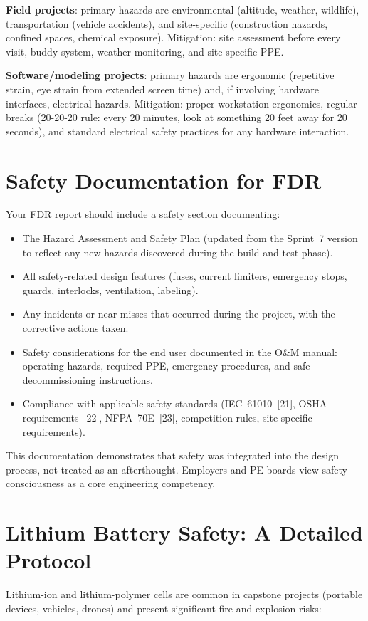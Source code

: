 \textbf{Field projects}: primary hazards are environmental (altitude, weather, wildlife), transportation (vehicle accidents), and site-specific (construction hazards, confined spaces, chemical exposure). Mitigation: site assessment before every visit, buddy system, weather monitoring, and site-specific PPE.

\textbf{Software/modeling projects}: primary hazards are ergonomic (repetitive strain, eye strain from extended screen time) and, if involving hardware interfaces, electrical hazards. Mitigation: proper workstation ergonomics, regular breaks (20-20-20 rule: every 20 minutes, look at something 20 feet away for 20 seconds), and standard electrical safety practices for any hardware interaction.

\section{Safety Documentation for FDR}
Your FDR report should include a safety section documenting:

\begin{itemize}[nosep,leftmargin=1.5em]
\item The Hazard Assessment and Safety Plan (updated from the Sprint~7 version to reflect any new hazards discovered during the build and test phase).
\item All safety-related design features (fuses, current limiters, emergency stops, guards, interlocks, ventilation, labeling).
\item Any incidents or near-misses that occurred during the project, with the corrective actions taken.
\item Safety considerations for the end user documented in the O\&M manual: operating hazards, required PPE, emergency procedures, and safe decommissioning instructions.
\item Compliance with applicable safety standards (IEC~61010~[21], OSHA requirements~[22], NFPA~70E~[23], competition rules, site-specific requirements).
\end{itemize}

This documentation demonstrates that safety was integrated into the design process, not treated as an afterthought. Employers and PE boards view safety consciousness as a core engineering competency.



\section{Lithium Battery Safety: A Detailed Protocol}
Lithium-ion and lithium-polymer cells are common in capstone projects (portable devices, vehicles, drones) and present significant fire and explosion risks:

